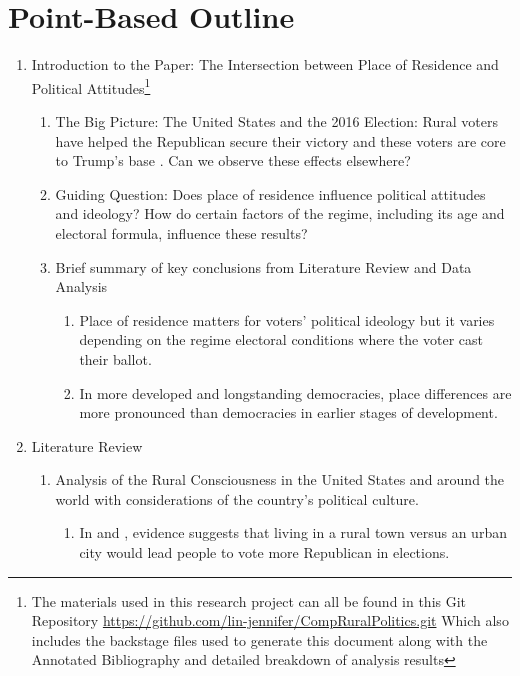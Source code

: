 \documentclass[12pt]{article}
\title{\tb{Place of Residence and Political Attitudes in Democracies Worldwide \\ {\large Point-Based Outline} }}
\author{Jennifer Lin}
\affil{Transitions to Democracy}
\begin{document}
\maketitle 

\section{Point-Based Outline}

\begin{enumerate}
\item Introduction to the Paper: The Intersection between Place of Residence and Political Attitudes\footnote{The materials used in this research project can all be found in this Git Repository \url{https://github.com/lin-jennifer/CompRuralPolitics.git} Which also includes the backstage files used to generate this document along with the Annotated Bibliography and detailed breakdown of analysis results}
\begin{enumerate}
	\item The Big Picture: The United States and the 2016 Election: Rural voters have helped the Republican secure their victory and these voters are core to Trump's base \citep{walsh_putting_2012}. Can we observe these effects elsewhere?
	\item Guiding Question: Does place of residence influence political attitudes and ideology? How do certain factors of the regime, including its age and electoral formula, influence these results?
	\item Brief summary of key conclusions from Literature Review and Data Analysis
	\begin{enumerate}
		\item Place of residence matters for voters' political ideology but it varies depending on the regime electoral conditions where the voter cast their ballot.
		\item In more developed and longstanding democracies, place differences are more pronounced than democracies in earlier stages of development.
	\end{enumerate}
\end{enumerate}
\item Literature Review
\begin{enumerate}
	\item Analysis of the Rural Consciousness in the United States and around the world with considerations of the country's political culture.
	\begin{enumerate}
		\item In \cite{walsh_putting_2012} and \cite{gimpel_rural_2006}, evidence suggests that living in a rural town versus an urban city would lead people to vote more Republican in elections.

\end{enumerate}
\end{enumerate}
\end{enumerate}
\end{document}
